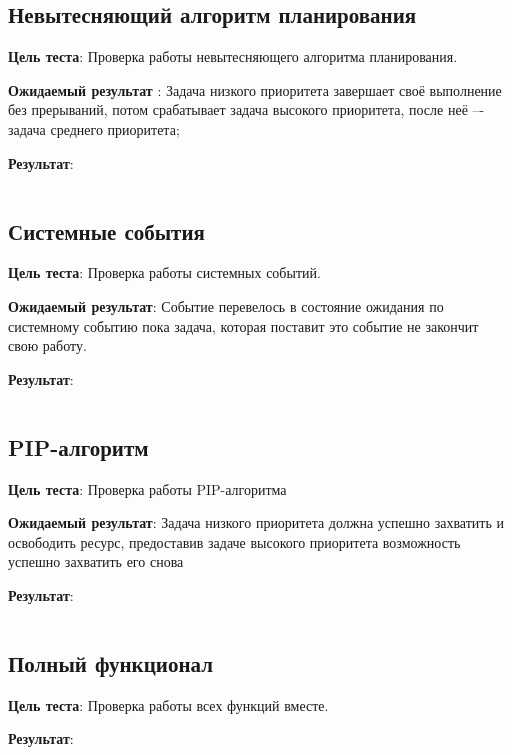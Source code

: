 \subsection{Невытесняющий алгоритм планирования}

\noindent
\textbf{Цель теста}: Проверка работы невытесняющего алгоритма планирования.

\noindent
\textbf{Ожидаемый результат }: Задача низкого приоритета завершает своё выполнение без
прерываний, потом срабатывает задача высокого приоритета, после неё –- задача среднего
приоритета;

\noindent
\textbf{Результат}: 
\inputminted[linenos=false]{text}{results/test1.txt}

\subsection{Системные события}

\noindent
\textbf{Цель теста}: Проверка работы системных событий.

\noindent
\textbf{Ожидаемый результат}: Событие перевелось в состояние ожидания по системному событию пока задача, которая
поставит это событие не закончит свою работу.

\noindent
\textbf{Результат}: 
\inputminted[linenos=false]{text}{results/test2.txt}
\subsection{PIP-алгоритм}

\noindent
\textbf{Цель теста}: Проверка работы PIP-алгоритма

\noindent
\textbf{Ожидаемый результат}: Задача низкого приоритета должна успешно захватить и освободить
ресурс, предоставив задаче высокого приоритета возможность успешно захватить
его снова

\noindent
\textbf{Результат}: 
\inputminted[linenos=false]{text}{results/test3.txt}
\subsection{Полный функционал}

\noindent
\textbf{Цель теста}: Проверка работы всех функций вместе.

\noindent
\textbf{Результат}: 
\inputminted[linenos=false]{text}{results/test4.txt}